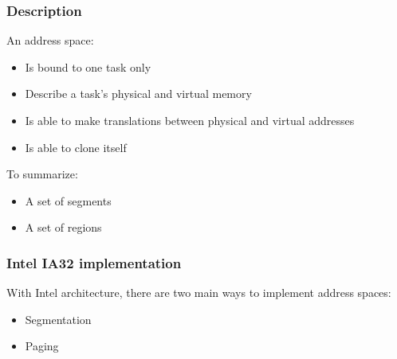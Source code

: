 \begin{frame}
  \frametitle{Description}

  An address space:

  \-

  \begin{itemize}
  \item Is bound to one task only
  \item Describe a task's physical and virtual memory
  \item Is able to make translations between physical and virtual addresses
  \item Is able to clone itself
  \end{itemize}

  \-

  To summarize:

  \-

  \begin{itemize}
  \item A set of segments
  \item A set of regions
  \end{itemize}

\end{frame}


\begin{frame}
  \frametitle{Intel IA32 implementation}

  With Intel architecture, there are two main ways to implement address spaces:

  \-

  \begin{itemize}
  \item Segmentation
  \item Paging
  \end{itemize}

\end{frame}


